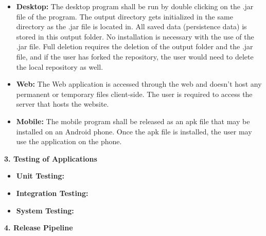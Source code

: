 \documentclass[12pt]{article}
\begin{document}
\begin{itemize}
	\item \textbf{Desktop:} The desktop program shall be run by double clicking on the .jar file of the program. The output directory gets initialized in the same directory as the .jar file is located in. All saved data (persistence data) is stored in this output folder. No installation is necessary with the use of the .jar file. Full deletion requires the deletion of the output folder and the .jar file, and if the user has forked the repository, the user would need to delete the local repository as well.
	
	\item \textbf{Web:} The Web application is accessed through the web and doesn't host any permanent or temporary files client-side. The user is required to access the server that hosts the website.
	
	\item \textbf{Mobile:} The mobile program shall be released as an apk file that may be installed on an Android phone. Once the apk file is installed, the user may use the application on the phone. 
\end{itemize}

\textbf{3. Testing of Applications}


\begin{itemize}
	\item \textbf{Unit Testing:}
	\item \textbf{Integration Testing:}
	\item \textbf{System Testing:}
\end{itemize}

\textbf{4. Release Pipeline}
\end{document}
